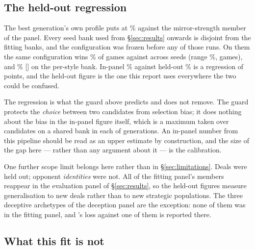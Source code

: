 \subsection{The held-out regression}
\label{sec:fit-heldout}

The best generation's own profile puts \vfive{} at \numFitWorst\% against the
mirror-strength member of the panel. Every seed bank used from
\S\ref{sec:results} onwards is disjoint from the fitting banks, and the
configuration was frozen before any of those runs. On them the same configuration
wins \numHeadWin\% of games against \vfour{} across \numHeadSeeds{} seeds (range
\numHeadRange\%, \numHeadGames{} games), and \numPanelVfiveVfour\%
[\numStyleCIVfour] on the per-style bank. In-panel \numFitWorst\% against
held-out \numHeadWin\% is a regression of \numFitRegression{} points, and the
held-out figure is the one this report uses everywhere the two could be confused.

The regression is what the guard above predicts and does not remove. The guard
protects the \emph{choice} between two candidates from selection bias; it does
nothing about the bias in the in-panel figure itself, which is a maximum taken
over \numFitPop{} candidates on a shared bank in each of \numFitGens{}
generations. An in-panel number from this pipeline should be read as an upper
estimate by construction, and the size of the gap here --- rather than any
argument about it --- is the calibration.

One further scope limit belongs here rather than in \S\ref{sec:limitations}.
Deals were held out; opponent \emph{identities} were not. All \numFitPanelN{} of
the fitting panel's members reappear in the evaluation panel of
\S\ref{sec:results}, so the held-out figures measure generalisation to new deals
rather than to new strategic populations. The three deceptive archetypes of the
deception panel are the exception: none of them was in the fitting panel, and
\vfive{}'s loss against one of them is reported there.

\subsection{What this fit is not}
\label{sec:fit-limits}


